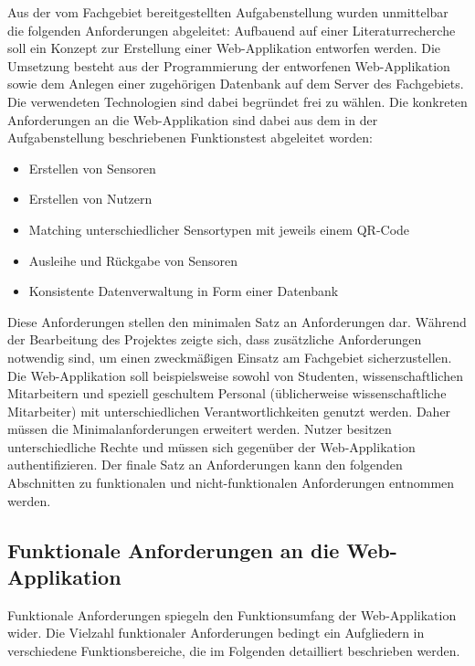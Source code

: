\documentclass[
]{article}
\providecommand{\tightlist}{%
  \setlength{\itemsep}{0pt}\setlength{\parskip}{0pt}}
\begin{document}
Aus der vom Fachgebiet bereitgestellten Aufgabenstellung wurden unmittelbar die folgenden Anforderungen abgeleitet: Aufbauend auf einer Literaturrecherche soll ein Konzept zur Erstellung einer Web-Applikation entworfen werden. Die Umsetzung besteht aus der Programmierung der entworfenen Web-Applikation sowie dem Anlegen einer zugehörigen Datenbank auf dem Server des Fachgebiets. Die verwendeten Technologien sind dabei begründet frei zu wählen. Die konkreten Anforderungen an die Web-Applikation sind dabei aus dem in der Aufgabenstellung beschriebenen Funktionstest abgeleitet worden:

\begin{itemize}
\tightlist
\item
  Erstellen von Sensoren
\item
  Erstellen von Nutzern
\item
  Matching unterschiedlicher Sensortypen mit jeweils einem QR-Code
\item
  Ausleihe und Rückgabe von Sensoren
\item
  Konsistente Datenverwaltung in Form einer Datenbank
\end{itemize}

Diese Anforderungen stellen den minimalen Satz an Anforderungen dar. Während der Bearbeitung des Projektes zeigte sich, dass zusätzliche Anforderungen notwendig sind, um einen zweckmäßigen Einsatz am Fachgebiet sicherzustellen. Die Web-Applikation soll beispielsweise sowohl von Studenten, wissenschaftlichen Mitarbeitern und speziell geschultem Personal (üblicherweise wissenschaftliche Mitarbeiter) mit unterschiedlichen Verantwortlichkeiten genutzt werden. Daher müssen die Minimalanforderungen erweitert werden. Nutzer besitzen unterschiedliche Rechte und müssen sich gegenüber der Web-Applikation authentifizieren. Der finale Satz an Anforderungen kann den folgenden Abschnitten zu funktionalen und nicht-funktionalen Anforderungen entnommen werden.

\hypertarget{funktionale-anforderungen-an-die-web-applikation}{%
\subsection{Funktionale Anforderungen an die Web-Applikation}\label{funktionale-anforderungen-an-die-web-applikation}}

Funktionale Anforderungen spiegeln den Funktionsumfang der Web-Applikation wider. Die Vielzahl funktionaler Anforderungen bedingt ein Aufgliedern in verschiedene Funktionsbereiche, die im Folgenden detailliert beschrieben werden.
\end{document}

